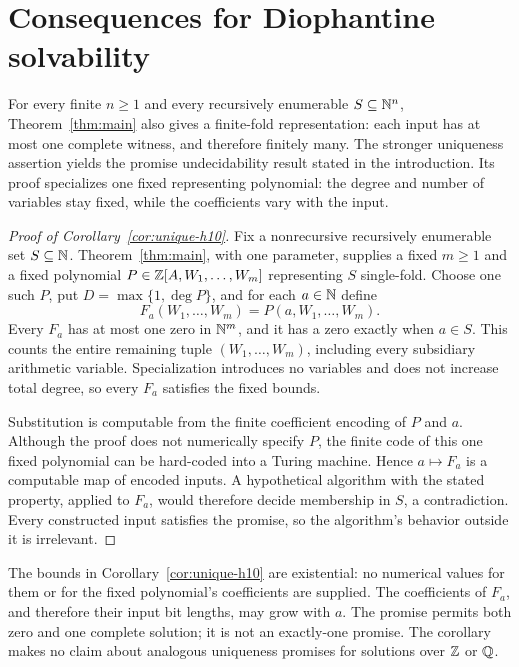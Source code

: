 \section{Consequences for Diophantine solvability}\label{sec:consequences}

For every finite $n\ge1$ and every recursively enumerable
$S\subseteq\mathbb N^n$, Theorem~\ref{thm:main} also gives a finite-fold
representation: each input has at most one complete witness, and therefore
finitely many. The stronger uniqueness assertion yields the promise
undecidability result stated in the introduction. Its proof specializes one
fixed representing polynomial: the degree and number of variables stay fixed,
while the coefficients vary with the input.

\begin{proof}[Proof of Corollary~\ref{cor:unique-h10}]
Fix a nonrecursive recursively enumerable set $S\subseteq\mathbb N$.
Theorem~\ref{thm:main}, with one parameter, supplies a fixed $m\ge1$ and
a fixed polynomial $P\in\mathbb Z[A,W_1,\ldots,W_m]$ representing $S$
single-fold. Choose one such $P$, put $D=\max\{1,\deg P\}$, and for
each $a\in\mathbb N$ define
\[
 F_a(W_1,\ldots,W_m)=P(a,W_1,\ldots,W_m).
\]
Every $F_a$ has at most one zero in $\mathbb N^m$, and it has a zero exactly
when $a\in S$. This counts the entire remaining tuple
$(W_1,\ldots,W_m)$, including every subsidiary arithmetic variable.
Specialization introduces no variables and does not increase total degree,
so every $F_a$ satisfies the fixed bounds.

Substitution is computable from the finite coefficient encoding of $P$ and
$a$. Although the proof does not numerically specify $P$, the finite code
of this one fixed polynomial can be hard-coded into a Turing machine. Hence $a\mapsto F_a$ is a computable map of encoded inputs.
A hypothetical algorithm with the stated property, applied to $F_a$, would
therefore decide membership in $S$, a contradiction. Every constructed
input satisfies the promise, so the algorithm's behavior outside it is
irrelevant.
\end{proof}

The bounds in Corollary~\ref{cor:unique-h10} are existential: no numerical
values for them or for the fixed polynomial's coefficients are supplied.
The coefficients of $F_a$, and therefore their input bit lengths, may grow
with $a$. The promise permits both zero and one complete solution; it is not an
exactly-one promise. The corollary makes no claim about analogous uniqueness
promises for solutions over $\mathbb Z$ or $\mathbb Q$.

